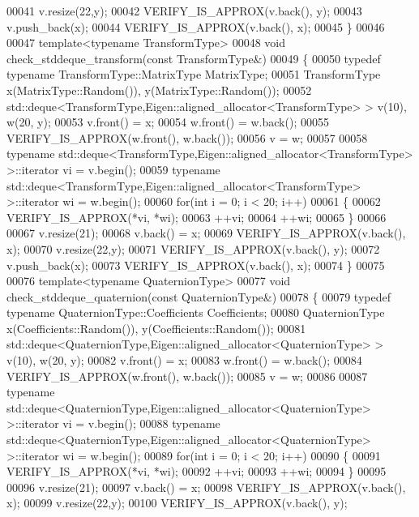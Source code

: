 \begin{DoxyCode}
00041   v.resize(22,y);
00042   VERIFY\_IS\_APPROX(v.back(), y);
00043   v.push\_back(x);
00044   VERIFY\_IS\_APPROX(v.back(), x);
00045 \}
00046 
00047 \textcolor{keyword}{template}<\textcolor{keyword}{typename} TransformType>
00048 \textcolor{keywordtype}{void} check\_stddeque\_transform(\textcolor{keyword}{const} TransformType&)
00049 \{
00050   \textcolor{keyword}{typedef} \textcolor{keyword}{typename} TransformType::MatrixType MatrixType;
00051   TransformType x(MatrixType::Random()), y(MatrixType::Random());
00052   std::deque<TransformType,Eigen::aligned\_allocator<TransformType> > v(10), w(20, y);
00053   v.front() = x;
00054   w.front() = w.back();
00055   VERIFY\_IS\_APPROX(w.front(), w.back());
00056   v = w;
00057 
00058   \textcolor{keyword}{typename} std::deque<TransformType,Eigen::aligned\_allocator<TransformType> >::iterator vi = v.begin();
00059   \textcolor{keyword}{typename} std::deque<TransformType,Eigen::aligned\_allocator<TransformType> >::iterator wi = w.begin();
00060   \textcolor{keywordflow}{for}(\textcolor{keywordtype}{int} i = 0; i < 20; i++)
00061   \{
00062     VERIFY\_IS\_APPROX(*vi, *wi);
00063     ++vi;
00064     ++wi;
00065   \}
00066 
00067   v.resize(21);
00068   v.back() = x;
00069   VERIFY\_IS\_APPROX(v.back(), x);
00070   v.resize(22,y);
00071   VERIFY\_IS\_APPROX(v.back(), y);
00072   v.push\_back(x);
00073   VERIFY\_IS\_APPROX(v.back(), x);
00074 \}
00075 
00076 \textcolor{keyword}{template}<\textcolor{keyword}{typename} QuaternionType>
00077 \textcolor{keywordtype}{void} check\_stddeque\_quaternion(\textcolor{keyword}{const} QuaternionType&)
00078 \{
00079   \textcolor{keyword}{typedef} \textcolor{keyword}{typename} QuaternionType::Coefficients Coefficients;
00080   QuaternionType x(Coefficients::Random()), y(Coefficients::Random());
00081   std::deque<QuaternionType,Eigen::aligned\_allocator<QuaternionType> > v(10), w(20, y);
00082   v.front() = x;
00083   w.front() = w.back();
00084   VERIFY\_IS\_APPROX(w.front(), w.back());
00085   v = w;
00086 
00087   \textcolor{keyword}{typename} std::deque<QuaternionType,Eigen::aligned\_allocator<QuaternionType> >::iterator vi = v.begin();
00088   \textcolor{keyword}{typename} std::deque<QuaternionType,Eigen::aligned\_allocator<QuaternionType> >::iterator wi = w.begin();
00089   \textcolor{keywordflow}{for}(\textcolor{keywordtype}{int} i = 0; i < 20; i++)
00090   \{
00091     VERIFY\_IS\_APPROX(*vi, *wi);
00092     ++vi;
00093     ++wi;
00094   \}
00095 
00096   v.resize(21);
00097   v.back() = x;
00098   VERIFY\_IS\_APPROX(v.back(), x);
00099   v.resize(22,y);
00100   VERIFY\_IS\_APPROX(v.back(), y);

\end{DoxyCode}
